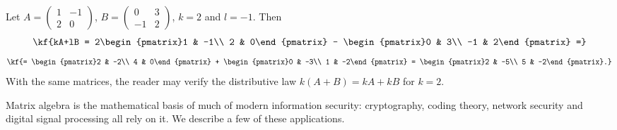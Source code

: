 \begin{misol}
Let $A=\begin{pmatrix}1 & -1\\ 2 & 0\end{pmatrix}$,
$B=\begin{pmatrix}0 & 3\\ -1 & 2\end{pmatrix}$, $k=2$ and $l=-1$. Then
\[\kf{kA+lB = 2\begin{pmatrix}1 & -1\\ 2 & 0\end{pmatrix} - \begin{pmatrix}0 & 3\\ -1 & 2\end{pmatrix}
=}\] \[\kf{= \begin{pmatrix}2 & -2\\ 4 & 0\end{pmatrix} + \begin{pmatrix}0 & -3\\ 1 & -2\end{pmatrix}
= \begin{pmatrix}2 & -5\\ 5 & -2\end{pmatrix}.}\]
With the same matrices, the reader may verify the distributive law
$k(A+B)=kA+kB$ for $k=2$.
\end{misol}
\bigskip
Matrix algebra is the mathematical basis of much of modern information security:
cryptography, coding theory, network security and digital signal processing all
rely on it. We describe a few of these applications.
